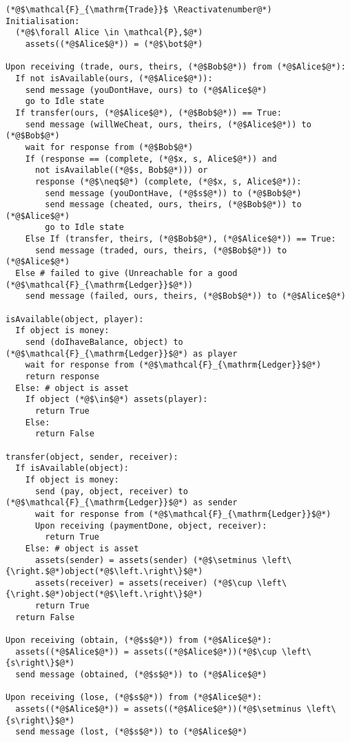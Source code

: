 \Suppressnumber
\begin{lstlisting}[label=tradefunc, style=numbers]
(*@$\mathcal{F}_{\mathrm{Trade}}$ \Reactivatenumber@*)
Initialisation:
  (*@$\forall Alice \in \mathcal{P},$@*)
    assets((*@$Alice$@*)) = (*@$\bot$@*)

Upon receiving (trade, ours, theirs, (*@$Bob$@*)) from (*@$Alice$@*):
  If not isAvailable(ours, (*@$Alice$@*)):
    send message (youDontHave, ours) to (*@$Alice$@*)
    go to Idle state
  If transfer(ours, (*@$Alice$@*), (*@$Bob$@*)) == True:
    send message (willWeCheat, ours, theirs, (*@$Alice$@*)) to (*@$Bob$@*)
    wait for response from (*@$Bob$@*)
    If (response == (complete, (*@$x, s, Alice$@*)) and
      not isAvailable((*@$s, Bob$@*))) or
      response (*@$\neq$@*) (complete, (*@$x, s, Alice$@*)):
        send message (youDontHave, (*@$s$@*)) to (*@$Bob$@*)
        send message (cheated, ours, theirs, (*@$Bob$@*)) to (*@$Alice$@*)
        go to Idle state
    Else If (transfer, theirs, (*@$Bob$@*), (*@$Alice$@*)) == True:
      send message (traded, ours, theirs, (*@$Bob$@*)) to (*@$Alice$@*)
  Else # failed to give (Unreachable for a good (*@$\mathcal{F}_{\mathrm{Ledger}}$@*))
    send message (failed, ours, theirs, (*@$Bob$@*)) to (*@$Alice$@*)

isAvailable(object, player):
  If object is money:
    send (doIhaveBalance, object) to (*@$\mathcal{F}_{\mathrm{Ledger}}$@*) as player
    wait for response from (*@$\mathcal{F}_{\mathrm{Ledger}}$@*)
    return response
  Else: # object is asset
    If object (*@$\in$@*) assets(player):
      return True
    Else:
      return False

transfer(object, sender, receiver):
  If isAvailable(object):
    If object is money:
      send (pay, object, receiver) to (*@$\mathcal{F}_{\mathrm{Ledger}}$@*) as sender
      wait for response from (*@$\mathcal{F}_{\mathrm{Ledger}}$@*)
      Upon receiving (paymentDone, object, receiver):
        return True
    Else: # object is asset
      assets(sender) = assets(sender) (*@$\setminus \left\{\right.$@*)object(*@$\left.\right\}$@*)
      assets(receiver) = assets(receiver) (*@$\cup \left\{\right.$@*)object(*@$\left.\right\}$@*)
      return True
  return False

Upon receiving (obtain, (*@$s$@*)) from (*@$Alice$@*):
  assets((*@$Alice$@*)) = assets((*@$Alice$@*))(*@$\cup \left\{s\right\}$@*)
  send message (obtained, (*@$s$@*)) to (*@$Alice$@*)

Upon receiving (lose, (*@$s$@*)) from (*@$Alice$@*):
  assets((*@$Alice$@*)) = assets((*@$Alice$@*))(*@$\setminus \left\{s\right\}$@*)
  send message (lost, (*@$s$@*)) to (*@$Alice$@*)
\end{lstlisting}
